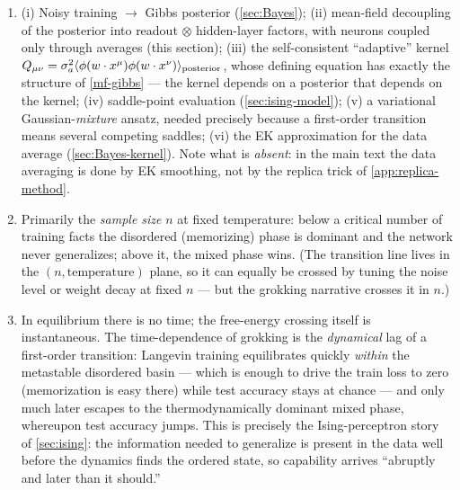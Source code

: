 \documentclass[11pt]{article}
\begin{document}
\begin{solution}[ex:grok]
\begin{enumerate}
    \item (i) Noisy training $\to$ Gibbs posterior (\cref{sec:Bayes}); (ii) mean-field decoupling of the posterior into readout $\otimes$ hidden-layer factors, with neurons coupled only through averages (this section); (iii) the self-consistent ``adaptive'' kernel $Q_{\mu\nu}=\sigma_a^2\langle \phi(w\cdot x^\mu)\phi(w\cdot x^\nu)\rangle_{\rm posterior}$, whose defining equation has exactly the structure of \eqref{mf-gibbs} --- the kernel depends on a posterior that depends on the kernel; (iv) saddle-point evaluation (\cref{sec:ising-model}); (v) a variational Gaussian-\emph{mixture} ansatz, needed precisely because a first-order transition means several competing saddles; (vi) the EK approximation for the data average (\cref{sec:Bayes-kernel}). Note what is \emph{absent}: in the main text the data averaging is done by EK smoothing, not by the replica trick of \cref{app:replica-method}.
    \item Primarily the \emph{sample size} $n$ at fixed temperature: below a critical number of training facts the disordered (memorizing) phase is dominant and the network never generalizes; above it, the mixed phase wins. (The transition line lives in the $(n,\text{temperature})$ plane, so it can equally be crossed by tuning the noise level or weight decay at fixed $n$ --- but the grokking narrative crosses it in $n$.)
    \item In equilibrium there is no time; the free-energy crossing itself is instantaneous. The time-dependence of grokking is the \emph{dynamical} lag of a first-order transition: Langevin training equilibrates quickly \emph{within} the metastable disordered basin --- which is enough to drive the train loss to zero (memorization is easy there) while test accuracy stays at chance --- and only much later escapes to the thermodynamically dominant mixed phase, whereupon test accuracy jumps. This is precisely the Ising-perceptron story of \cref{sec:ising}: the information needed to generalize is present in the data well before the dynamics finds the ordered state, so capability arrives ``abruptly and later than it should.''
\end{enumerate}
\end{solution}
\end{document}
